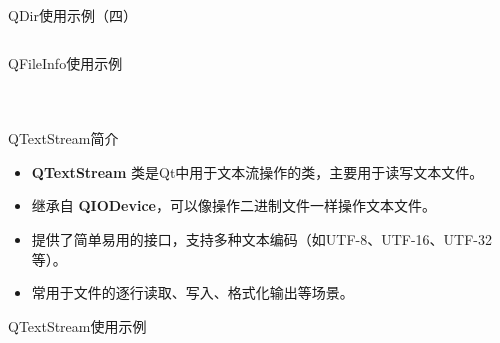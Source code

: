 \documentclass[UTF8,aspectratio=169]{beamer}
\begin{document}
\begin{frame}[fragile]{QDir使用示例（四）}
    \inputminted[firstline=99,lastline=119]{cpp}{code/qt_dir_example.cpp}
\end{frame}

\begin{frame}[fragile]{QFileInfo使用示例}
    \begin{columns}
        \begin{column}{0.48\textwidth}
            \inputminted[firstline=1,lastline=23]{cpp}{code/qt_fileinfo_example.cpp}
        \end{column}
        \begin{column}{0.48\textwidth}
            \inputminted[firstline=24,lastline=42]{cpp}{code/qt_fileinfo_example.cpp}
        \end{column}
    \end{columns}
\end{frame}

\begin{frame}[fragile]{QTextStream简介}
    \begin{itemize}
        \item \textbf{QTextStream} 类是Qt中用于文本流操作的类，主要用于读写文本文件。
        \item 继承自 \textbf{QIODevice}，可以像操作二进制文件一样操作文本文件。
        \item 提供了简单易用的接口，支持多种文本编码（如UTF-8、UTF-16、UTF-32等）。
        \item 常用于文件的逐行读取、写入、格式化输出等场景。
    \end{itemize}
\end{frame}

\begin{frame}[fragile]{QTextStream使用示例}
    \begin{columns}
        \begin{column}{0.48\textwidth}
            \inputminted[firstline=1,lastline=19]{cpp}{code/qt_textstream_example.cpp}
        \end{column}
        \begin{column}{0.48\textwidth}
            \inputminted[firstline=21,lastline=34]{cpp}{code/qt_textstream_example.cpp}
        \end{column}
    \end{columns}
\end{frame}
\end{document}
